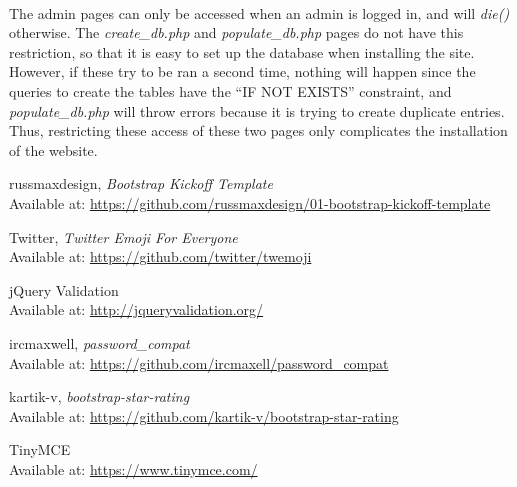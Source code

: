 \documentclass[11pt,letterpaper,titlepage]{article}
\begin{document}
    \paragraph{}
    The admin pages can only be accessed when an admin is logged in, and will
    \emph{die()} otherwise. The \emph{create\_db.php} and
    \emph{populate\_db.php} pages do not have this restriction, so that it is
    easy to set up the database  when installing the site. However, if these try
    to be ran a second time, nothing  will happen since the queries to create
    the tables have the ``IF NOT EXISTS'' constraint,  and
    \emph{populate\_db.php} will throw errors because it is trying to  create
    duplicate entries. Thus, restricting these access of these two pages only
    complicates the installation of the website.



    \newpage
    \begin{thebibliography}{9}

          russmaxdesign,
          \emph{Bootstrap Kickoff Template}\\
          Available at:
          \href{https://github.com/russmaxdesign/01-bootstrap-kickoff-template}
               {https://github.com/russmaxdesign/01-bootstrap-kickoff-template}

        Twitter,
        \emph{Twitter Emoji For Everyone}\\
        Available at: \href{https://github.com/twitter/twemoji}
                        {https://github.com/twitter/twemoji}

        jQuery Validation\\
        Available at: \href{http://jqueryvalidation.org/}
                           {http://jqueryvalidation.org/}

        ircmaxwell,
        \emph{password\_compat}\\
        Available at: \href{https://github.com/ircmaxell/password_compat}
                           {https://github.com/ircmaxell/password\_compat}

       kartik-v,
       \emph{bootstrap-star-rating}\\
       Available at: \href{https://github.com/kartik-v/bootstrap-star-rating}
                          {https://github.com/kartik-v/bootstrap-star-rating}

       TinyMCE\\
       Available at: \href{https://www.tinymce.com/}
                          {https://www.tinymce.com/}

    \end{thebibliography}
\end{document}
